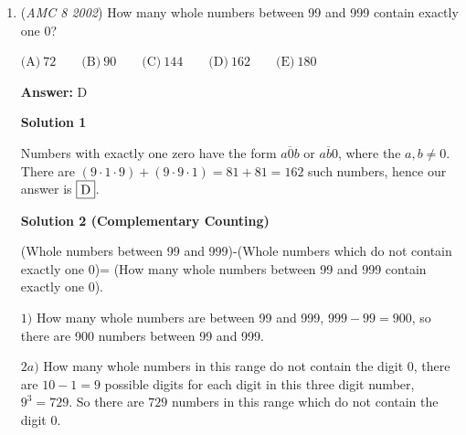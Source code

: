 \begin{enumerate}
\textbf{Solution 1}

Converting into minutes and adding, we get that she skated $75*5+90*3+x = 375+270+x = 645+x$ minutes total, where $x$ is the amount she skated on day $9$. Dividing by $9$ to get the average, we get $\frac{645+x}{9}=85$. Solving for $x$, 
 \[645+x=765\] 
 \[x=120\] Now we convert back into hours and minutes to get $\boxed{\text{(E)}\ 2\ \text{hr}}$.

 



\textbf{Solution 2}

For the first five days, each day you are $10$ minutes short of $85$ minutes. And for the next three days, you are $5$ minutes above $85$ minutes. So in total you are missing $3*5-5*10$, which equals to negative $35$. So on the ninth day, to have an average of $85$ minutes, Gage need to skate for $85+35$ minutes, which is $120$ minutes, or $\boxed{\text{(E)}\ 2\ \text{hr}}$.

 


	\item (\textit{AMC 8 2002}) How many whole numbers between 99 and 999 contain exactly one 0?


 $\text{(A)}\ 72 \qquad \text{(B)}\ 90 \qquad \text{(C)}\ 144 \qquad \text{(D)}\ 162 \qquad \text{(E)}\ 180$

 \textbf{Answer: }D



\textbf{Solution 1}

Numbers with exactly one zero have the form $\overline{a0b}$ or $\overline{ab0}$, where the $a,b \neq 0$. There are $(9\cdot1\cdot9)+(9\cdot9\cdot1) = 81+81 = \boxed{162}$ such numbers, hence our answer is $\fbox{D}$.

 



\textbf{Solution 2 (Complementary Counting)}

(Whole numbers between 99 and 999)-(Whole numbers which do not contain exactly one 0)= (How many whole numbers between 99 and 999 contain exactly one 0).

 $1)$ How many whole numbers are between 99 and 999, $999-99=900$, so there are 900 numbers between 99 and 999.

 $2a)$ How many whole numbers in this range do not contain the digit $0$, there are $10-1=9$ possible digits for each digit in this three digit number, $9^3=729$. So there are $729$ numbers in this range which do not contain the digit $0$.


\end{enumerate}
